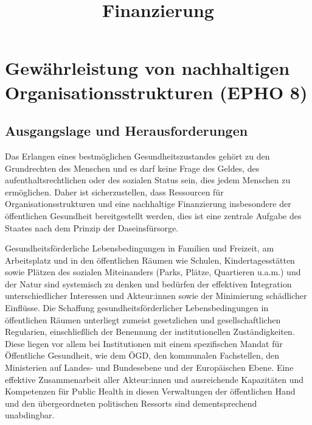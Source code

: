 \documentclass{article}
\begin{document}
\title{Finanzierung}

\maketitle


\section{Gewährleistung von nachhaltigen Organisationsstrukturen (EPHO 8)}\label{H8649178}



\subsection{Ausgangslage und Herausforderungen}\label{H5298330}



Das Erlangen eines bestmöglichen Gesundheitszustandes gehört zu den Grundrechten des Menschen und es darf keine Frage des Geldes, des aufenthaltsrechtlichen oder des sozialen Status sein, dies jedem Menschen zu ermöglichen. Daher ist sicherzustellen, dass Ressourcen für Organisationsstrukturen und eine nachhaltige Finanzierung insbesondere der öffentlichen Gesundheit bereitgestellt werden, dies ist eine zentrale Aufgabe des Staates nach dem Prinzip der Daseinsfürsorge.


Gesundheitsförderliche Lebensbedingungen in Familien und Freizeit, am Arbeitsplatz und in den öffentlichen Räumen wie Schulen, Kindertagesstätten sowie Plätzen des sozialen Miteinanders (Parks, Plätze, Quartieren u.a.m.) und der Natur sind systemisch zu denken und bedürfen der effektiven Integration unterschiedlicher Interessen und Akteur:innen sowie der Minimierung schädlicher Einflüsse. Die Schaffung gesundheitsförderlicher Lebensbedingungen in öffentlichen Räumen unterliegt zumeist gesetzlichen und gesellschaftlichen Regularien, einschließlich der Benennung der institutionellen Zuständigkeiten. Diese liegen vor allem bei Institutionen mit einem spezifischen Mandat für Öffentliche Gesundheit, wie dem ÖGD, den kommunalen Fachstellen, den Ministerien auf Landes- und Bundesebene und der Europäischen Ebene. Eine effektive Zusammenarbeit aller Akteur:innen und ausreichende Kapazitäten und Kompetenzen für Public Health in diesen Verwaltungen der öffentlichen Hand und den übergeordneten politischen Ressorts sind dementsprechend unabdingbar. 
\end{document}
